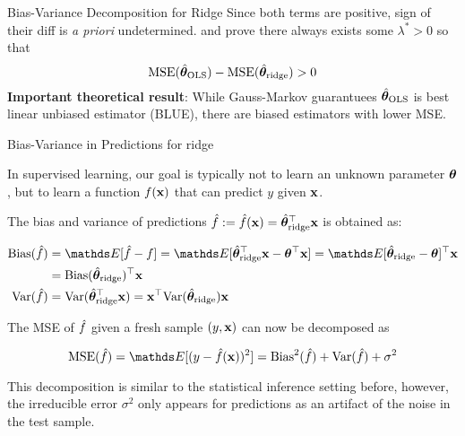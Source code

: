 \documentclass[11pt,compress,t,notes=noshow, xcolor=table]{beamer}
\begin{document}
\begin{vbframe}{Bias-Variance Decomposition for Ridge}
Since both terms are positive, sign of their diff is \textit{a priori} undetermined.  and  prove there always exists some $\lambda^{\ast}>0$ so that
$$\text{MSE}(\hat{\bm{\theta}}_{\text{OLS}})-\text{MSE}(\hat{\bm{\theta}}_{\text{ridge}})>0$$
\textbf{Important theoretical result}: While Gauss-Markov guarantuees $\hat{\bm{\theta}}_{\text{OLS}}$ is best linear unbiased estimator (BLUE), there are biased estimators with lower MSE.

\end{vbframe}

\begin{vbframe}{Bias-Variance in Predictions for ridge}

In supervised learning, our goal is typically not to learn an unknown parameter $\bm{\theta}$, but to learn a function $f(\mathbf{x})$ that can predict $y$ given $\mathbf{x}$.

\vspace{0.2cm}

The bias and variance of predictions $\hat{f}:=\hat{f}(\mathbf{x})=\hat{\bm{\theta}}_{\text{ridge}}^{\top} \mathbf{x}$ is obtained as:

\begin{align*}
\text{Bias}(\fh)&=\E[\hat{f}-f]=\E[\thetah_{\text{ridge}}^{\top} \xv - \thetab^{\top} \xv]=\E[\thetah_{\text{ridge}}-\thetab]^{\top} \xv\\ 
&= \text{Bias}(\thetah_{\text{ridge}})^{\top} \xv \\
\text{Var}(\fh)&=\text{Var}(\thetah_{\text{ridge}}^{\top} \xv) = \xv^{\top} \text{Var}(\thetah_{\text{ridge}}) \xv
\end{align*}

The MSE of $\hat{f}$ given a fresh sample $(y,\mathbf{x})$ can now be decomposed as

$$\text{MSE}(\fh)=\E[(y-\fh(\xv))^2]=\text{Bias}^{2}(\fh) + \text{Var}(\fh) + \sigma^2$$

This decomposition is similar to the statistical inference setting before, however, the irreducible error $\sigma^2$ only appears for predictions as an artifact
of the noise in the test sample.

\end{vbframe}





\endlecture
\end{document}

